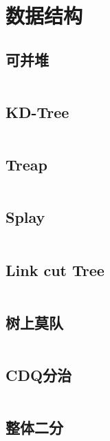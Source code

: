 \chapter{数据结构}
\section{可并堆}
\inputminted{cpp}{\source/data-structure/heap.cpp}
\section{KD-Tree}
\inputminted{cpp}{\source/data-structure/kd-tree.cpp}
\section{Treap}
\inputminted{cpp}{\source/data-structure/treap.cpp}
\section{Splay}
\inputminted{cpp}{\source/data-structure/spaly.cpp}
\section{Link cut Tree}
\inputminted{cpp}{\source/data-structure/link-cut-tree.cpp}
\section{树上莫队}
\inputminted{cpp}{\source/data-structure/mo'alogorithm-on-tree.cpp}
\section{CDQ分治}
\inputminted{cpp}{\source/data-structure/cdq.cpp}
\section{整体二分}
\inputminted{cpp}{\source/data-structure/general-binary.cpp}

